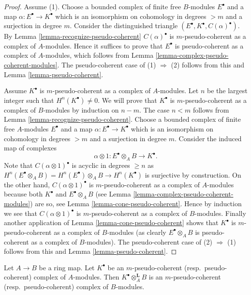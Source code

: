 \begin{proof}
Assume (1). Choose a bounded complex of finite free $B$-modules
$E^\bullet$ and a map $\alpha : E^\bullet \to K^\bullet$ which is
an isomorphism on cohomology in degrees $> m$ and a surjection in degree $m$.
Consider the distinguished triangle
$(E^\bullet, K^\bullet, C(\alpha)^\bullet)$. By
Lemma \ref{lemma-recognize-pseudo-coherent}
$C(\alpha)^\bullet$ is $m$-pseudo-coherent as a complex of
$A$-modules. Hence it suffices to prove that $E^\bullet$ is
pseudo-coherent as a complex of $A$-modules, which follows from
Lemma \ref{lemma-complex-pseudo-coherent-modules}.
The pseudo-coherent case of (1) $\Rightarrow$ (2) follows from this and
Lemma \ref{lemma-pseudo-coherent}.

\medskip\noindent
Assume $K^\bullet$ is $m$-pseudo-coherent as a complex of $A$-modules.
Let $n$ be the largest integer such that $H^n(K^\bullet) \not = 0$.
We will prove that $K^\bullet$ is $m$-pseudo-coherent as a complex
of $B$-modules by induction on $n - m$. The case $n < m$ follows from
Lemma \ref{lemma-recognize-pseudo-coherent}.
Choose a bounded complex of finite free $A$-modules $E^\bullet$ and a
map $\alpha : E^\bullet \to K^\bullet$ which is an isomorphism on
cohomology in degrees $> m$ and a surjection in degree $m$.
Consider the induced map of complexes
$$
\alpha \otimes 1 : E^\bullet \otimes_A B \to K^\bullet.
$$
Note that $C(\alpha \otimes 1)^\bullet$ is acyclic in degrees
$\geq n$ as
$H^n(E^\bullet \otimes_A B) = H^n(E^\bullet) \otimes_A B \to H^n(K^\bullet)$
is surjective by construction. On the other hand, $C(\alpha \otimes 1)^\bullet$
is $m$-pseudo-coherent as a complex of $A$-modules because
both $K^\bullet$ and $E^\bullet \otimes_A B$ (see
Lemma \ref{lemma-complex-pseudo-coherent-modules})
are so, see
Lemma \ref{lemma-cone-pseudo-coherent}.
Hence by induction we see that $C(\alpha \otimes 1)^\bullet$
is $m$-pseudo-coherent as a complex of $B$-modules. Finally
another application of
Lemma \ref{lemma-cone-pseudo-coherent}
shows that $K^\bullet$ is $m$-pseudo-coherent as a complex of $B$-modules
(as clearly $E^\bullet \otimes_A B$ is pseudo-coherent as a complex
of $B$-modules). The pseudo-coherent case
of (2) $\Rightarrow$ (1) follows from this and
Lemma \ref{lemma-pseudo-coherent}.
\end{proof}

\begin{lemma}
\label{lemma-pull-pseudo-coherent}
Let $A \to B$ be a ring map.
Let $K^\bullet$ be an $m$-pseudo-coherent (resp.\ pseudo-coherent)
complex of $A$-modules. Then $K^\bullet \otimes_A^{\mathbf{L}} B$
is an $m$-pseudo-coherent (resp.\ pseudo-coherent) complex of $B$-modules. 
\end{lemma}

